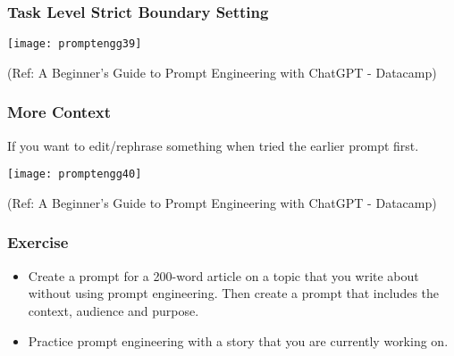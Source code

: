 \begin{frame}[fragile]\frametitle{Task Level Strict Boundary Setting}


\begin{center}
\texttt{[image: promptengg39]}

{\tiny (Ref: A Beginner's Guide to Prompt Engineering with ChatGPT - Datacamp)}
\end{center}		
		

\end{frame}

\begin{frame}[fragile]\frametitle{More Context}

If you want to edit/rephrase something when tried the earlier prompt first.

\begin{center}
\texttt{[image: promptengg40]}

{\tiny (Ref: A Beginner's Guide to Prompt Engineering with ChatGPT - Datacamp)}
\end{center}		
		

\end{frame}


\begin{frame}[fragile]\frametitle{Exercise}

\begin{itemize}
\item Create a prompt for a 200-word article on a topic that you write about without using prompt engineering. Then create a prompt that includes the context, audience and purpose. 
\item Practice prompt engineering with a story that you are currently working on.
\end{itemize}	 

\end{frame}






